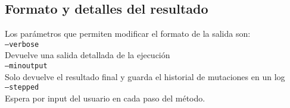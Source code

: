 \subsection{Formato y detalles del resultado}\label{output}
Los parámetros que permiten modificar el formato de la salida son:
\vspace{0.2cm}\\
\texttt{--verbose} \\
\indent \indent Devuelve una salida detallada de la ejecución \\
\texttt{--minoutput} \\
\indent \indent Solo devuelve el resultado final y guarda el historial de mutaciones en un log \\
\texttt{--stepped} \\
\indent \indent Espera por input del usuario en cada paso del método. \\
